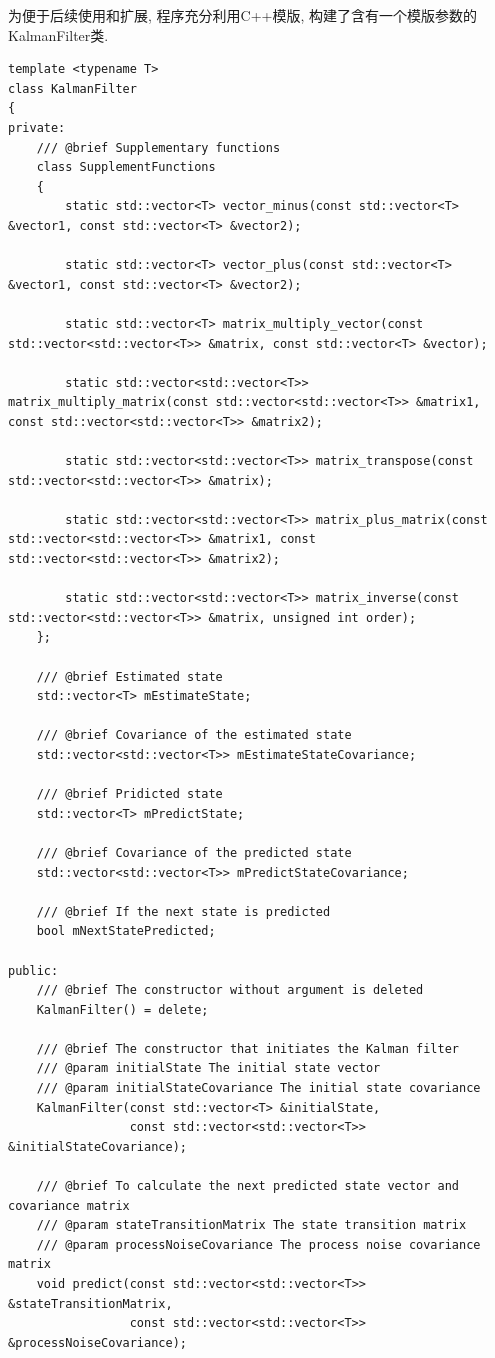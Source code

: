 \documentclass[12pt]{article}
\begin{document}
为便于后续使用和扩展, 程序充分利用C++模版, 构建了含有一个模版参数的KalmanFilter类. 
\begin{lstlisting}
template <typename T>
class KalmanFilter
{
private:
    /// @brief Supplementary functions
    class SupplementFunctions
    {
    	static std::vector<T> vector_minus(const std::vector<T> &vector1, const std::vector<T> &vector2);
		
		static std::vector<T> vector_plus(const std::vector<T> &vector1, const std::vector<T> &vector2);
		
		static std::vector<T> matrix_multiply_vector(const std::vector<std::vector<T>> &matrix, const std::vector<T> &vector);
		
		static std::vector<std::vector<T>> matrix_multiply_matrix(const std::vector<std::vector<T>> &matrix1, const std::vector<std::vector<T>> &matrix2);
		
		static std::vector<std::vector<T>> matrix_transpose(const std::vector<std::vector<T>> &matrix);
		
		static std::vector<std::vector<T>> matrix_plus_matrix(const std::vector<std::vector<T>> &matrix1, const std::vector<std::vector<T>> &matrix2);
		
		static std::vector<std::vector<T>> matrix_inverse(const std::vector<std::vector<T>> &matrix, unsigned int order);
    };
    
    /// @brief Estimated state
    std::vector<T> mEstimateState;

    /// @brief Covariance of the estimated state
    std::vector<std::vector<T>> mEstimateStateCovariance;

    /// @brief Pridicted state
    std::vector<T> mPredictState;

    /// @brief Covariance of the predicted state
    std::vector<std::vector<T>> mPredictStateCovariance;

    /// @brief If the next state is predicted
    bool mNextStatePredicted;
    
public:
    /// @brief The constructor without argument is deleted
    KalmanFilter() = delete;

    /// @brief The constructor that initiates the Kalman filter
    /// @param initialState The initial state vector
    /// @param initialStateCovariance The initial state covariance
    KalmanFilter(const std::vector<T> &initialState,
                 const std::vector<std::vector<T>> &initialStateCovariance);
                 
    /// @brief To calculate the next predicted state vector and covariance matrix
    /// @param stateTransitionMatrix The state transition matrix
    /// @param processNoiseCovariance The process noise covariance matrix
    void predict(const std::vector<std::vector<T>> &stateTransitionMatrix,
                 const std::vector<std::vector<T>> &processNoiseCovariance);
    

\end{lstlisting}
\end{document}
